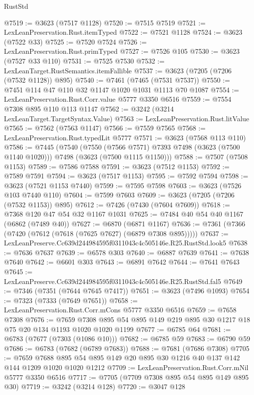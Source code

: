 \begin{lexlean}{RustStd}
\begin{coremodule}
@7519 := @3623 (@7517 @1128)
@7520 := @7515 @7519
@7521 := LexLeanPreservation.Rust.itemTyped
@7522 := @7521 @1128
@7524 := @3623 (@7522 @33)
@7525 := @7520 @7524
@7526 := LexLeanPreservation.Rust.primTyped
@7527 := @7526 @105
@7530 := @3623 (@7527 @33 @110)
@7531 := @7525 @7530
@7532 := LexLeanTarget.RustSemantics.itemFallible
@7537 := @3623 (@7205 (@7206 (@7532 @1128)) @895)
@7540 := @7461 (@7465 (@7531 @7537))
@7550 := @7451 @114 @47 @110 @32 @1147 @1020 @1031 @1113 @70 @1087
@7554 := LexLeanPreservation.Rust.Corr.value @5777 @3350 @6516
@7559 := @7554 @7308 @895 @110 @113 @1147
@7562 := @3242 (@3214 LexLeanTarget.TargetSyntax.Value)
@7563 := LexLeanPreservation.Rust.litValue
@7565 := @7562 (@7563 @1147)
@7566 := @7559 @7565
@7568 := LexLeanPreservation.Rust.typedLit @5777
@7571 := @3623 (@7568 @113 @110)
@7586 := @7445
    (@7540
      (@7550 (@7566 @7571) @7393 @7498 (@3623 (@7500 @1140 @1020)))
      @7498
      (@3623 (@7500 @1115 @1150)))
@7588 := @7507 (@7508 @1153)
@7589 := @7586 @7588
@7591 := @3623 (@7512 @1153)
@7592 := @7589 @7591
@7594 := @3623 (@7517 @1153)
@7595 := @7592 @7594
@7598 := @3623 (@7521 @1153 @7440)
@7599 := @7595 @7598
@7603 := @3623 (@7526 @103 @7440 @110)
@7604 := @7599 @7603
@7609 := @3623 (@7205 (@7206 (@7532 @1153)) @895)
@7612 := @7426 (@7430 (@7604 @7609))
@7618 := @7368 @120 @47 @54 @32 @1167 @1031
@7625 := @7484 @40 @54 @40 @1167 (@6862 (@7489 @40))
@7627 := @6870 (@6871 @1167)
@7636 := @7361 (@7366 (@7420 (@7612 (@7618 (@7625 @7627) (@6879 @7308 @895)))))
@7637 := LexLeanPreserve.Cc639d244984595f0311043c4c505146e.R25.RustStd.look5
@7638 := @7636 @7637
@7639 := @6578 @303
@7640 := @6887 @7639
@7641 := @7638 @7640
@7642 := @6601 @303
@7643 := @6891 @7642
@7644 := @7641 @7643
@7645 := LexLeanPreserve.Cc639d244984595f0311043c4c505146e.R25.RustStd.fal5
@7649 := @7346 (@7351 (@7644 @7645 @7417))
@7651 := @3623 (@7496 @1093)
@7654 := @7323 (@7333 (@7649 @7651))
@7658 := LexLeanPreservation.Rust.Corr.mCons @5777 @3350 @6516
@7659 := @7658 @7308
@7676 := @7659 @7308 @895 @54 @895 @149 @219 @895 @30 @1217 @18 @75 @20 @134 @1193 @1020 @1020 @1199
@7677 := @6785 @64
@7681 := @6783 (@7677 (@7303 (@1086 @10)))
@7682 := @6785 @59
@7683 := @6790 @59
@7686 := @6783 (@7682 (@6789 @7683))
@7688 := @7681 (@7686 @7308)
@7705 := @7659
    @7688
    @895
    @54
    @895
    @149
    @20
    @895
    @30
    @1216
    @40
    @137
    @142
    @144
    @1209
    @1020
    @1020
    @1212
@7709 := LexLeanPreservation.Rust.Corr.mNil @5777 @3350 @6516
@7717 := @7705 (@7709 @7308 @895 @54 @895 @149 @895 @30)
@7719 := @3242 (@3214 @128)
@7720 := @3047 @128

\end{coremodule}
\end{lexlean}
